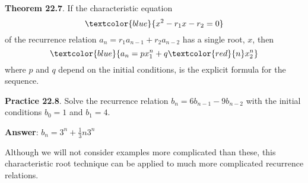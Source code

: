 \documentclass[aspectratio=169]{beamer}
\providecommand{\Blue}[1]{\textcolor{blue}{#1}}
\providecommand{\Red}[1]{\textcolor{red}{#1}}
\begin{document}
\begin{frame}[plain]{}

 {\bf Theorem 22.7}. If the characteristic equation 
     \[ \Blue{x^2 - r_1x - r_{2} = 0 }
     \]
     of the recurrence relation $a_n = r_1a_{n-1}+r_2a_{n-2}$ has 
     a single root, $x$, then 
     \[ \Blue{a_n = px_1^n + q\Red{n}x_2^n} 
     \]
     where $p$ and $q$ depend on the initial conditions, is the explicit formula
     for the sequence.
     \medskip
     
 {\bf Practice 22.8}.  Solve the recurrence relation
    $b_n = 6b_{n-1}-9b_{n-2}$ with the initial conditions $b_0=1$ and $b_1=4$. \pause
    \medskip
    
    {\bf Answer}: $b_n = 3^n + \frac{1}{3}n3^n$
    \medskip
    
    Although we will not consider examples more complicated than
these, this characteristic root technique can be applied to much more
complicated recurrence relations. 
    
    \vspace{.2in}
         
\end{frame}
\end{document}
